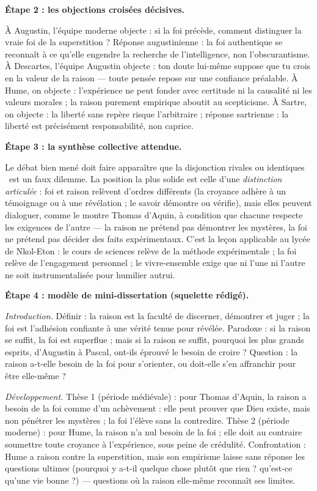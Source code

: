 \documentclass[11pt]{article}
\begin{document}
\begin{exoresolu}
\textbf{Étape 2 : les objections croisées décisives.}

À Augustin, l'équipe moderne objecte : si la foi précède, comment distinguer la vraie foi de la superstition ? Réponse augustinienne : la foi authentique se reconnaît à ce qu'elle engendre la recherche de l'intelligence, non l'obscurantisme. À Descartes, l'équipe Augustin objecte : ton doute lui-même suppose que tu crois en la valeur de la raison — toute pensée repose sur une confiance préalable. À Hume, on objecte : l'expérience ne peut fonder avec certitude ni la causalité ni les valeurs morales ; la raison purement empirique aboutit au scepticisme. À Sartre, on objecte : la liberté sans repère risque l'arbitraire ; réponse sartrienne : la liberté est précisément responsabilité, non caprice.

\textbf{Étape 3 : la synthèse collective attendue.}

Le débat bien mené doit faire apparaître que la disjonction \guillemotleft rivales ou identiques \guillemotright\ est un faux dilemme. La position la plus solide est celle d'une \emph{distinction articulée} : foi et raison relèvent d'ordres différents (la croyance adhère à un témoignage ou à une révélation ; le savoir démontre ou vérifie), mais elles peuvent dialoguer, comme le montre Thomas d'Aquin, à condition que chacune respecte les exigences de l'autre — la raison ne prétend pas démontrer les mystères, la foi ne prétend pas décider des faits expérimentaux. C'est la leçon applicable au lycée de Nkol-Eton : le cours de sciences relève de la méthode expérimentale ; la foi relève de l'engagement personnel ; le vivre-ensemble exige que ni l'une ni l'autre ne soit instrumentalisée pour humilier autrui.

\textbf{Étape 4 : modèle de mini-dissertation (squelette rédigé).}

\emph{Introduction.} Définir : la raison est la faculté de discerner, démontrer et juger ; la foi est l'adhésion confiante à une vérité tenue pour révélée. Paradoxe : si la raison se suffit, la foi est superflue ; mais si la raison se suffit, pourquoi les plus grands esprits, d'Augustin à Pascal, ont-ils éprouvé le besoin de croire ? Question : la raison a-t-elle besoin de la foi pour s'orienter, ou doit-elle s'en affranchir pour être elle-même ?

\emph{Développement.} Thèse 1 (période médiévale) : pour Thomas d'Aquin, la raison a besoin de la foi comme d'un achèvement : elle peut prouver que Dieu existe, mais non pénétrer les mystères ; la foi l'élève sans la contredire. Thèse 2 (période moderne) : pour Hume, la raison n'a nul besoin de la foi ; elle doit au contraire soumettre toute croyance à l'expérience, sous peine de crédulité. Confrontation : Hume a raison contre la superstition, mais son empirisme laisse sans réponse les questions ultimes (pourquoi y a-t-il quelque chose plutôt que rien ? qu'est-ce qu'une vie bonne ?) — questions où la raison elle-même reconnaît ses limites.


\end{exoresolu}
\end{document}

